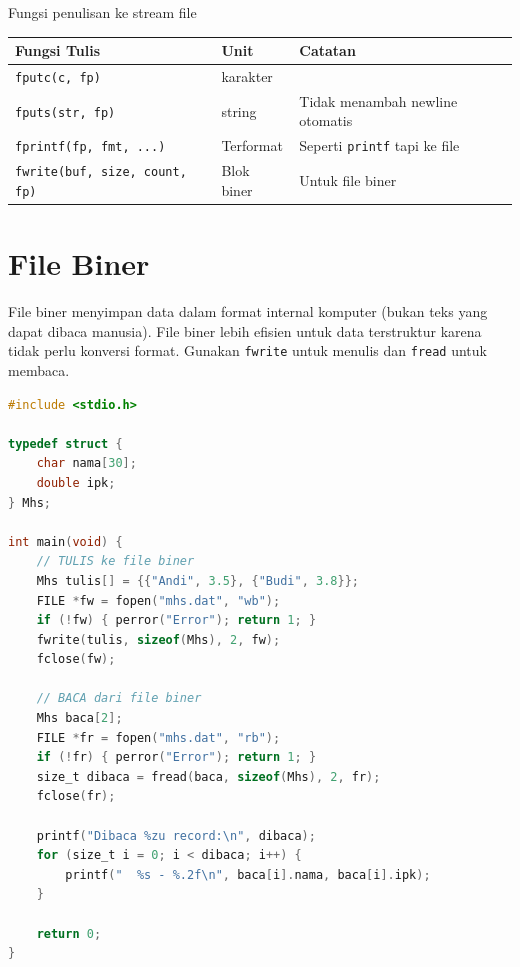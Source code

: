 \documentclass[../main.tex]{subfiles}
\begin{document}
\begin{modultable}[]{Fungsi penulisan ke stream file}
{\small
\begin{tabular}{|>{\raggedright\arraybackslash}p{3.0cm}|>{\raggedright\arraybackslash}p{3.2cm}|>{\raggedright\arraybackslash}p{6.5cm}|}
\hline
\textbf{Fungsi Tulis} & \textbf{Unit} & \textbf{Catatan} \\
\hline
\texttt{fputc(c, fp)} & 1 karakter & \\
\hline
\texttt{fputs(str, fp)} & 1 string & Tidak menambah newline otomatis \\
\hline
\texttt{fprintf(fp, fmt, ...)} & Terformat & Seperti \texttt{printf} tapi ke file \\
\hline
\texttt{fwrite(buf, size, count, fp)} & Blok biner & Untuk file biner \\
\hline
\end{tabular}
}
\end{modultable}

\section{File Biner}

File biner menyimpan data dalam format internal komputer (bukan teks yang dapat dibaca manusia). File biner lebih efisien untuk data terstruktur karena tidak perlu konversi format. Gunakan \texttt{fwrite} untuk menulis dan \texttt{fread} untuk membaca.

\begin{lstlisting}[language=C,caption=Menulis dan membaca struct ke/dari file biner]
#include <stdio.h>

typedef struct {
    char nama[30];
    double ipk;
} Mhs;

int main(void) {
    // TULIS ke file biner
    Mhs tulis[] = {{"Andi", 3.5}, {"Budi", 3.8}};
    FILE *fw = fopen("mhs.dat", "wb");
    if (!fw) { perror("Error"); return 1; }
    fwrite(tulis, sizeof(Mhs), 2, fw);
    fclose(fw);
    
    // BACA dari file biner
    Mhs baca[2];
    FILE *fr = fopen("mhs.dat", "rb");
    if (!fr) { perror("Error"); return 1; }
    size_t dibaca = fread(baca, sizeof(Mhs), 2, fr);
    fclose(fr);
    
    printf("Dibaca %zu record:\n", dibaca);
    for (size_t i = 0; i < dibaca; i++) {
        printf("  %s - %.2f\n", baca[i].nama, baca[i].ipk);
    }
    
    return 0;
}
\end{lstlisting}
\end{document}
